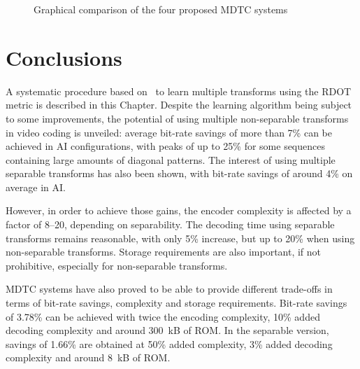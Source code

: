 \documentclass[11pt,a4paper,openright,twoside]{book}
\numberwithin{equation}{section} %
\numberwithin{figure}{section} %
\numberwithin{table}{section} %
\begin{document}
\begin{figure}[tb]
	\def\scale{0.26}
	\def\encmax{2000}
	\def\decmax{130}
	\def\bdrmax{-8}
	\def\rommax{8192}
	\centering
	\def\bdr{-1.66}
	\def\enc{150}
	\def\dec{103}
	\def\rom{8.20}
	\def\bdr{-3.78}
	\def\enc{200}
	\def\dec{110}
	\def\rom{148.75}

	\def\bdr{-4.10}
	\def\enc{800}
	\def\dec{105}
	\def\rom{236.25}
	\def\bdr{-7.10}
	\def\enc{2000}
	\def\dec{120}
	\def\rom{4618.24}
	\caption{Graphical comparison of the four proposed \acs{MDTC} systems}
	\label{fig:four_way_mdtc_comparison}
\end{figure}

\section{Conclusions}
\label{sec:mdtc_conclusions}

A systematic procedure based on~\cite{sezer-08-sparse-orthonormal-transforms}
to learn multiple transforms using the \ac{RDOT} metric is described in this
Chapter.
Despite the learning algorithm being subject to some improvements, the
potential of using multiple non-separable transforms in video coding is
unveiled:
average bit-rate savings of more than 7\% can be achieved in \ac{AI}
configurations, with peaks of up to 25\% for some sequences containing large
amounts of diagonal patterns.
The interest of using multiple separable transforms has also been shown, with
bit-rate savings of around 4\% on average in \ac{AI}.

However, in order to achieve those gains, the encoder complexity is affected
by a factor of 8--20, depending on separability.
The decoding time using separable transforms remains reasonable, with only 5\%
increase, but up to 20\% when using non-separable transforms.
Storage requirements are also important, if not prohibitive, especially for
non-separable transforms.

\ac{MDTC} systems have also proved to be able to provide different trade-offs
in terms of bit-rate savings, complexity and storage requirements.
Bit-rate savings of 3.78\% can be achieved with twice the encoding complexity,
10\% added decoding complexity and around \SI{300}{\kilo B} of \acs{ROM}.
In the separable version, savings of 1.66\% are obtained at 50\% added
complexity, 3\% added decoding complexity and around \SI{8}{\kilo B} of
\acs{ROM}.
\end{document}
